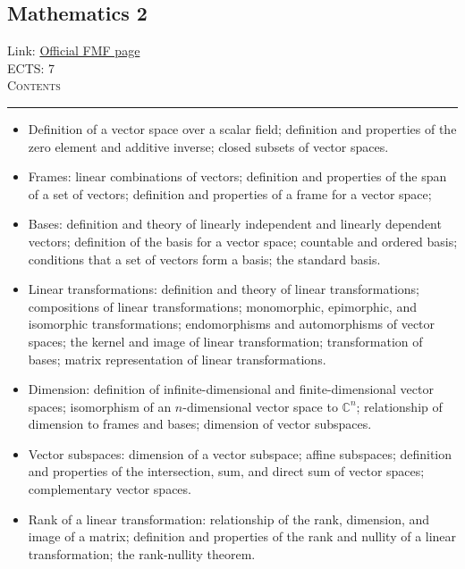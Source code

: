 \documentclass[11pt, a4paper]{article}
\newenvironment{course}[3]{
\subsection{#1}%
Link: \href{#2}{Official FMF page}\\%
ECTS: #3%
\vspace{1ex}
\\
{\large \textsc{Contents}}\\[-0.9ex]%
\rule{\textwidth}{0.5pt}
\vspace{-3ex}
}
{}
\newenvironment{chapter}[1]{
\begin{tcolorbox}[title=#1, breakable]
}
{\end{tcolorbox}}
\begin{document}
\begin{course}{Mathematics 2}{https://www.fmf.uni-lj.si/en/study-physics/programmes/1fiz/2020/7000777/courses/521/}{7}
\begin{chapter}{Matrices}
\begin{itemize}
        \end{itemize}
    \end{chapter}

    \begin{chapter}{Finite-dimensional vector spaces}
        \begin{itemize}
        
            \item Definition of a vector space over a scalar field; definition and properties of the zero element and additive inverse; closed subsets of vector spaces.

            \item Frames: linear combinations of vectors; definition and properties of the span of a set of vectors; definition and properties of a frame for a vector space; 

            \item Bases: definition and theory of linearly independent and linearly dependent vectors; definition of the basis for a vector space; countable and ordered basis; conditions that a set of vectors form a basis; the standard basis.

            \item Linear transformations: definition and theory of linear transformations; compositions of linear transformations; monomorphic, epimorphic, and isomorphic transformations; endomorphisms and automorphisms of vector spaces; the kernel and image of linear transformation; transformation of bases; matrix representation of linear transformations.

            \item Dimension: definition of infinite-dimensional and finite-dimensional vector spaces; 
            isomorphism of an $ n $-dimensional vector space to $ \mathbb{C}^{n} $;
            relationship of dimension to frames and bases;
            dimension of vector subspaces.

            \item Vector subspaces: dimension of a vector subspace; affine subspaces; definition and properties of the intersection, sum, and direct sum of vector spaces; complementary vector spaces.

            \item Rank of a linear transformation: relationship of the rank, dimension, and image of a matrix; definition and properties of the rank and nullity of a linear transformation; the rank-nullity theorem.

        \end{itemize}
    \end{chapter}


\end{course}
\end{document}
